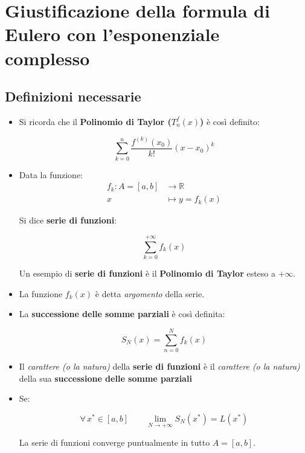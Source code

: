 \documentclass[../dimostrazioni]{subfiles}
\begin{document}
    \chapter{Giustificazione della formula di Eulero con l’esponenziale complesso}
    \label{formulaEulero}

        \section*{Definizioni necessarie}

            \begin{itemize}
                \item Si ricorda che il \textbf{Polinomio di Taylor (\(T _n ^ f (x) \))} è così definito:

                        \[ \sum_{k = 0}^{n} \frac{f^{(k)} (x_0)}{k!}(x-x_0)^k\]
                    
                \item Data la funzione:
                        \begin{align*}
                            f_k : A = [a, b] &\longrightarrow \mathbb{R}\\
                                         x &\longmapsto y = f_k(x) 
                        \end{align*}
    
                        Si dice \textbf{serie di funzioni}:

                        \[  \sum_{k=0}^{+\infty} f_k(x) \]

                        Un esempio di \textbf{serie di funzioni} è il \textbf{Polinomio di Taylor} esteso a \(+\infty\).

                \item La funzione \(f_k(x)\) è detta \textit{argomento} della serie.
                \item La \textbf{successione delle somme parziali} è così definita:
                      
                        \[  S_N (x) = \sum_{n=0}^{N} f_k(x) \]
                    
                \item Il  \textit{carattere (o la natura)} della \textbf{serie di funzioni} è il \textit{carattere (o la natura)} della sua \textbf{successione delle somme parziali}
                \item Se:
                
                        \[  \forall \, x^* \in [a, b] \qquad \lim_{N \to +\infty} S_N (x^*) = L(x^*)    \]

                        La serie di funzioni converge puntualmente in tutto \(A = [a, b]\).
            \end{itemize}
           
\end{document}
